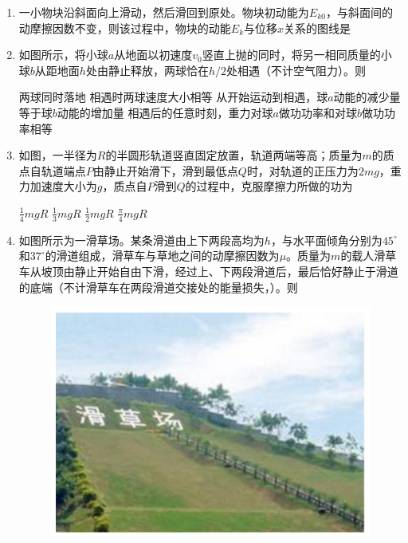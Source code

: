 \begin{enumerate}[leftmargin=0em]
\item 
{}
一小物块沿斜面向上滑动，然后滑回到原处。物块初动能为$ E_{k0} $，与斜面间的动摩擦因数不变，则该过程中，物块的动能$ E_{k} $与位移$ x $关系的图线是  
\begin{figure}[h!]
\centering

\end{figure}

\item 
{}
如图所示，将小球$ a $从地面以初速度$ v_{0} $竖直上抛的同时，将另一相同质量的小球$ b $从距地面$ h $处由静止释放，两球恰在$ h/2 $处相遇（不计空气阻力）。则  
\begin{figure}[h!]
\centering

\end{figure}

\fourchoices
{两球同时落地}
{相遇时两球速度大小相等}
{从开始运动到相遇，球$ a $动能的减少量等于球$ b $动能的增加量}
{相遇后的任意时刻，重力对球$ a $做功功率和对球$ b $做功功率相等}



\item
{}
如图，一半径为$ R $的半圆形轨道竖直固定放置，轨道两端等高；质量为$ m $的质点自轨道端点$ P $由静止开始滑下，滑到最低点$ Q $时，对轨道的正压力为$ 2mg $，重力加速度大小为$ g $，质点自$ P $滑到$ Q $的过程中，克服摩擦力所做的功为  
\begin{figure}[h!]
\centering

\end{figure}

\fourchoices
{$ \frac { 1 } { 4 } m g R $}
{$ \frac { 1 } { 3 } m g R $}
{$ \frac { 1 } { 2 } m g R $}
{$ \frac { \pi } { 4 } m g R $}



\item 
{}
如图所示为一滑草场。某条滑道由上下两段高均为$ h $，与水平面倾角分别为$ 45 ^{ \circ } $和$ 37 ^{ \circ } $的滑道组成，滑草车与草地之间的动摩擦因数为$ \mu $。质量为$ m $的载人滑草车从坡顶由静止开始自由下滑，经过上、下两段滑道后，最后恰好静止于滑道的底端（不计滑草车在两段滑道交接处的能量损失，）。则  
\begin{figure}[h!]
\centering
\includegraphics[width=0.23\linewidth]{picture/screenshot016}
\end{figure}


\end{enumerate}
